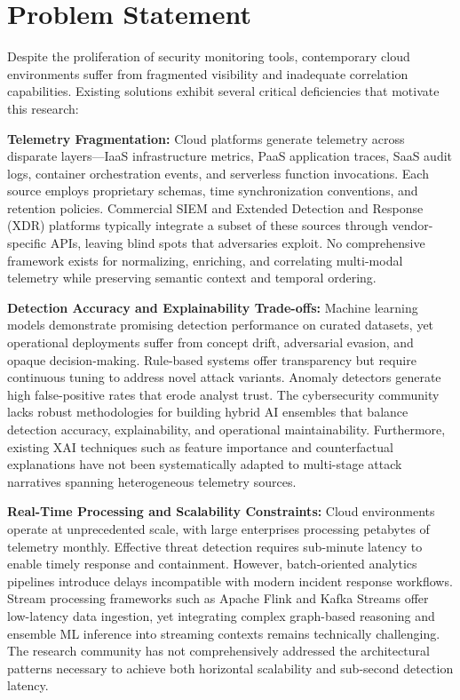 \section{Problem Statement}\label{sec:intro-problem}
Despite the proliferation of security monitoring tools, contemporary cloud environments suffer from fragmented visibility and inadequate correlation capabilities. Existing solutions exhibit several critical deficiencies that motivate this research:

\textbf{Telemetry Fragmentation:} Cloud platforms generate telemetry across disparate layers---IaaS infrastructure metrics, PaaS application traces, SaaS audit logs, container orchestration events, and serverless function invocations. Each source employs proprietary schemas, time synchronization conventions, and retention policies. Commercial SIEM and Extended Detection and Response (XDR) platforms typically integrate a subset of these sources through vendor-specific APIs, leaving blind spots that adversaries exploit. No comprehensive framework exists for normalizing, enriching, and correlating multi-modal telemetry while preserving semantic context and temporal ordering.

\textbf{Detection Accuracy and Explainability Trade-offs:} Machine learning models demonstrate promising detection performance on curated datasets, yet operational deployments suffer from concept drift, adversarial evasion, and opaque decision-making. Rule-based systems offer transparency but require continuous tuning to address novel attack variants. Anomaly detectors generate high false-positive rates that erode analyst trust. The cybersecurity community lacks robust methodologies for building hybrid AI ensembles that balance detection accuracy, explainability, and operational maintainability. Furthermore, existing XAI techniques such as feature importance and counterfactual explanations have not been systematically adapted to multi-stage attack narratives spanning heterogeneous telemetry sources.

\textbf{Real-Time Processing and Scalability Constraints:} Cloud environments operate at unprecedented scale, with large enterprises processing petabytes of telemetry monthly. Effective threat detection requires sub-minute latency to enable timely response and containment. However, batch-oriented analytics pipelines introduce delays incompatible with modern incident response workflows. Stream processing frameworks such as Apache Flink and Kafka Streams offer low-latency data ingestion, yet integrating complex graph-based reasoning and ensemble ML inference into streaming contexts remains technically challenging. The research community has not comprehensively addressed the architectural patterns necessary to achieve both horizontal scalability and sub-second detection latency.

